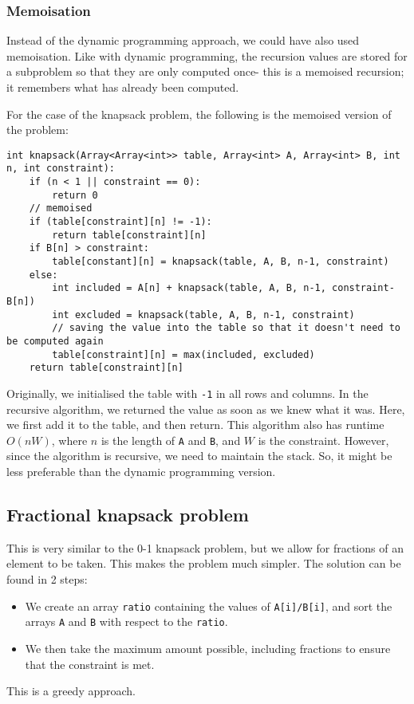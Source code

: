 \documentclass[a4paper, openany]{memoir}
\begin{document}
\subsubsection{Memoisation}
Instead of the dynamic programming approach, we could have also used memoisation. Like with dynamic programming, the recursion values are stored for a subproblem so that they are only computed once- this is a memoised recursion; it remembers what has already been computed.

\noindent For the case of the knapsack problem, the following is the memoised version of the problem:
\begin{lstlisting}[language=pseudocode]
int knapsack(Array<Array<int>> table, Array<int> A, Array<int> B, int n, int constraint):
    if (n < 1 || constraint == 0):
        return 0
    // memoised
    if (table[constraint][n] != -1):
        return table[constraint][n]
    if B[n] > constraint:
        table[constant][n] = knapsack(table, A, B, n-1, constraint)
    else:
        int included = A[n] + knapsack(table, A, B, n-1, constraint-B[n])
        int excluded = knapsack(table, A, B, n-1, constraint)
        // saving the value into the table so that it doesn't need to be computed again
        table[constraint][n] = max(included, excluded)
    return table[constraint][n]
\end{lstlisting}
Originally, we initialised the table with \texttt{-1} in all rows and columns. In the recursive algorithm, we returned the value as soon as we knew what it was. Here, we first add it to the table, and then return. This algorithm also has runtime $O(nW)$, where $n$ is the length of \texttt{A} and \texttt{B}, and $W$ is the constraint. However, since the algorithm is recursive, we need to maintain the stack. So, it might be less preferable than the dynamic programming version.

\subsection{Fractional knapsack problem}
This is very similar to the 0-1 knapsack problem, but we allow for fractions of an element to be taken. This makes the problem much simpler. The solution can be found in 2 steps:
\begin{itemize}
    \item We create an array \texttt{ratio} containing the values of \texttt{A[i]/B[i]}, and sort the arrays \texttt{A} and \texttt{B} with respect to the \texttt{ratio}.
    \item We then take the maximum amount possible, including fractions to ensure that the constraint is met.
\end{itemize}
This is a greedy approach.
\end{document}
